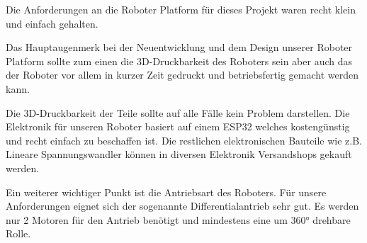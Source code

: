 \begin{flushleft}
    Die Anforderungen an die Roboter Platform für dieses Projekt waren recht klein und einfach gehalten.

    Das Hauptaugenmerk bei der Neuentwicklung und dem Design unserer Roboter Platform sollte zum einen 
    die 3D-Druckbarkeit des Roboters sein aber auch das der Roboter vor allem in kurzer Zeit gedruckt und betriebsfertig gemacht 
    werden kann.

    Die 3D-Druckbarkeit der Teile sollte auf alle Fälle kein Problem darstellen. Die Elektronik für unseren Roboter
    basiert auf einem ESP32 welches kostengünstig und recht einfach zu beschaffen ist. Die restlichen 
    elektronischen Bauteile wie z.B. Lineare Spannungswandler können in diversen Elektronik Versandshops gekauft werden.
    
    Ein weiterer wichtiger Punkt ist die Antriebsart des Roboters. Für unsere Anforderungen eignet sich der sogenannte
    Differentialantrieb sehr gut. Es werden nur 2 Motoren für den Antrieb benötigt und mindestens eine um 360° drehbare
    Rolle. 
\end{flushleft}
